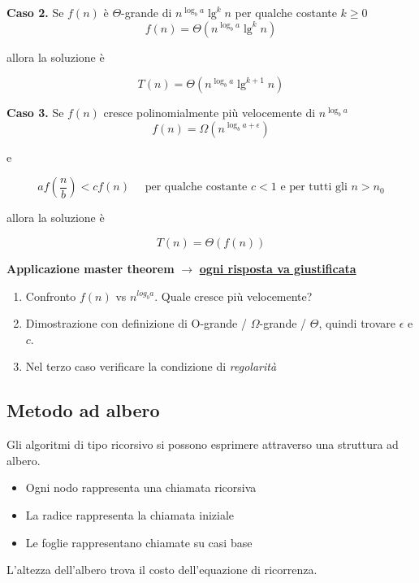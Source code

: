 \documentclass{article}
\begin{document}
\vspace{.7cm}

\textbf{Caso 2.}
Se \(f(n)\) è \(\Theta\)-grande di \(n^{\log_b a}\lg^k n\) per qualche costante \(k \geq 0\)
\[f(n) = \Theta\left(n^{\log_b a}\lg^k n\right)\]
\begin{center}allora la soluzione è\end{center}
\[T(n) = \Theta\left(n^{\log_b a} \lg^{k+1} n\right)\]

\vspace{.7cm}

\textbf{Caso 3.}
Se \(f(n)\) cresce polinomialmente più velocemente di \(n^{\log_b a}\)
\[f(n) = \Omega\left(n^{\log_b a + \epsilon}\right)\]
\begin{center}e\end{center}
\[a f(\frac{n}{b}) < c f(n) \quad \text{ per qualche costante } c < 1 \text{ e per tutti gli } n > n_0\]
\begin{center}allora la soluzione è\end{center}
\[T(n) = \Theta\left(f(n)\right)\]

\vspace{1.5cm}

\noindent\textbf{Applicazione master theorem} \(\rightarrow\) \underline{\textbf{ogni risposta va giustificata}}
\begin{enumerate}
    \item Confronto  \(f(n)\) vs \(n^{log_b a}\). Quale cresce più velocemente?
    \item Dimostrazione con definizione di O-grande / \(\Omega\)-grande / \(\Theta\), quindi trovare \(\epsilon\) e \(c\).
    \item Nel terzo caso verificare la condizione di \emph{regolarità}
\end{enumerate}

\subsection{Metodo ad albero}
Gli algoritmi di tipo ricorsivo si possono esprimere attraverso una struttura ad albero.
\begin{itemize}
    \item Ogni nodo rappresenta una chiamata ricorsiva
    \item La radice rappresenta la chiamata iniziale
    \item Le foglie rappresentano chiamate su casi base
\end{itemize}
L'altezza dell'albero trova il costo dell'equazione di ricorrenza.
\end{document}
